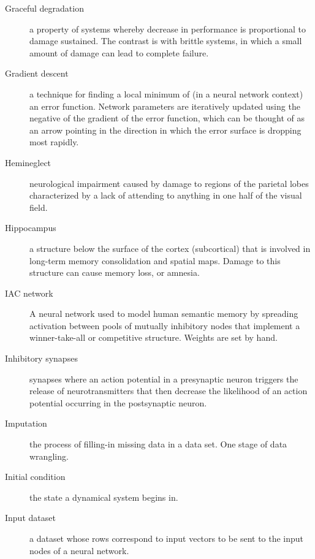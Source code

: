 \begin{description}
\item[Graceful degradation] a property of systems whereby decrease in performance is proportional to damage sustained. The contrast is with brittle systems, in which a small amount of damage can lead to complete failure.

\item[Gradient descent] a technique for finding a local minimum of (in a neural network context) an error function. Network parameters are iteratively updated using the negative of the gradient of the error function, which can be thought of as an arrow pointing in the direction in which the error surface is dropping most rapidly.


\item[Hemineglect] neurological impairment caused by damage to regions of the parietal lobes characterized by a lack of attending to anything in one half of the visual field.

\item[Hippocampus] a structure below the surface of the cortex (subcortical) that is involved in long-term memory consolidation and spatial maps. Damage to this structure can cause memory loss, or amnesia. 


\item[IAC network] A neural network used to model human semantic memory by spreading activation between pools of mutually inhibitory nodes that implement a winner-take-all or competitive structure. Weights are set by hand. 

\item[Inhibitory synapses] synapses where an action potential in a presynaptic neuron triggers the release of neurotransmitters that then decrease the likelihood of an action potential occurring in the postsynaptic neuron.

\item[Imputation] the process of filling-in missing data in a data set. One stage of data wrangling.

\item[Initial condition] the state a dynamical system begins in.

\item[Input dataset] a dataset whose rows correspond to input vectors to be sent to the input nodes of a neural network.


\end{description}
